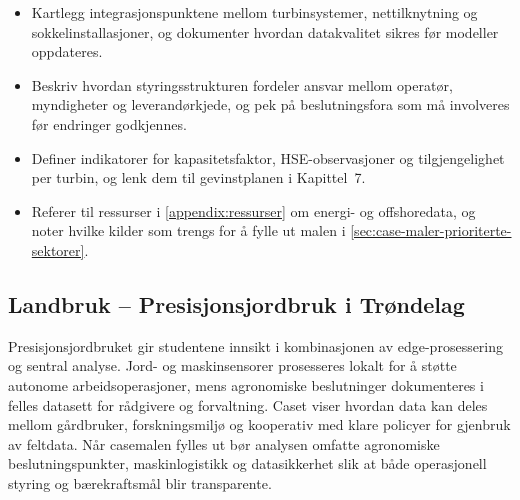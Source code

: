 \begin{itemize}
    \item Kartlegg integrasjonspunktene mellom turbinsystemer, nettilknytning og sokkelinstallasjoner, og dokumenter hvordan datakvalitet sikres før modeller oppdateres.\citep{nve2023havvindfakta}
    \item Beskriv hvordan styringsstrukturen fordeler ansvar mellom operatør, myndigheter og leverandørkjede, og pek på beslutningsfora som må involveres før endringer godkjennes.
    \item Definer indikatorer for kapasitetsfaktor, HSE-observasjoner og tilgjengelighet per turbin, og lenk dem til gevinstplanen i Kapittel~7.
    \item Referer til ressurser i \autoref{appendix:ressurser} om energi- og offshoredata, og noter hvilke kilder som trengs for å fylle ut malen i \autoref{sec:case-maler-prioriterte-sektorer}.
\end{itemize}

\subsection*{Landbruk – Presisjonsjordbruk i Trøndelag}
Presisjonsjordbruket gir studentene innsikt i kombinasjonen av edge-prosessering og sentral analyse. Jord- og maskinsensorer prosesseres lokalt for å støtte autonome arbeidsoperasjoner, mens agronomiske beslutninger dokumenteres i felles datasett for rådgivere og forvaltning.\citep{nibio2023dataflyt,landbruksdir2023digitalisering,etsi2023mec} Caset viser hvordan data kan deles mellom gårdbruker, forskningsmiljø og kooperativ med klare policyer for gjenbruk av feltdata. Når casemalen fylles ut bør analysen omfatte agronomiske beslutningspunkter, maskinlogistikk og datasikkerhet slik at både operasjonell styring og bærekraftsmål blir transparente.

